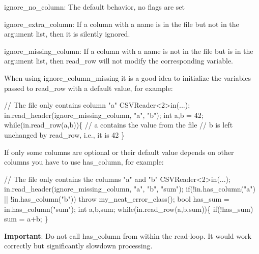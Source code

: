 \begin{DoxyItemize}
\item {\ttfamily ignore\+\_\+no\+\_\+column}\+: The default behavior, no flags are set
\item {\ttfamily ignore\+\_\+extra\+\_\+column}\+: If a column with a name is in the file but not in the argument list, then it is silently ignored.
\item {\ttfamily ignore\+\_\+missing\+\_\+column}\+: If a column with a name is not in the file but is in the argument list, then {\ttfamily read\+\_\+row} will not modify the corresponding variable.
\end{DoxyItemize}

When using {\ttfamily ignore\+\_\+column\+\_\+missing} it is a good idea to initialize the variables passed to {\ttfamily read\+\_\+row} with a default value, for example\+:


\begin{DoxyCode}
\textcolor{comment}{// The file only contains column "a"}
CSVReader<2>in(...);
in.read\_header(ignore\_missing\_column, \textcolor{stringliteral}{"a"}, \textcolor{stringliteral}{"b"});
\textcolor{keywordtype}{int} a,b = 42;
\textcolor{keywordflow}{while}(in.read\_row(a,b))\{
  \textcolor{comment}{// a contains the value from the file}
  \textcolor{comment}{// b is left unchanged by read\_row, i.e., it is 42}
\}
\end{DoxyCode}


If only some columns are optional or their default value depends on other columns you have to use {\ttfamily has\+\_\+column}, for example\+:


\begin{DoxyCode}
\textcolor{comment}{// The file only contains the columns "a" and "b"}
CSVReader<2>in(...);
in.read\_header(ignore\_missing\_column, \textcolor{stringliteral}{"a"}, \textcolor{stringliteral}{"b"}, \textcolor{stringliteral}{"sum"});
\textcolor{keywordflow}{if}(!in.has\_column(\textcolor{stringliteral}{"a"}) || !in.has\_column(\textcolor{stringliteral}{"b"}))
  \textcolor{keywordflow}{throw} my\_neat\_error\_class();
\textcolor{keywordtype}{bool} has\_sum = in.has\_column(\textcolor{stringliteral}{"sum"});
\textcolor{keywordtype}{int} a,b,sum;
\textcolor{keywordflow}{while}(in.read\_row(a,b,sum))\{
  \textcolor{keywordflow}{if}(!has\_sum)
    sum = a+b;
\}
\end{DoxyCode}


{\bfseries Important}\+: Do not call {\ttfamily has\+\_\+column} from within the read-\/loop. It would work correctly but significantly slowdown processing.

